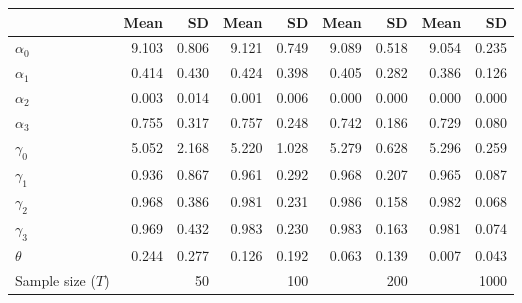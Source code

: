 
\begin{tabular}[t]{lrrrrrrrr}
\toprule
  & Mean & SD & Mean  & SD  & Mean   & SD   & Mean    & SD   \\
\midrule
$\alpha_{0}$ & 9.103 & 0.806 & 9.121 & 0.749 & 9.089 & 0.518 & 9.054 & 0.235\\
$\alpha_{1}$ & 0.414 & 0.430 & 0.424 & 0.398 & 0.405 & 0.282 & 0.386 & 0.126\\
$\alpha_{2}$ & 0.003 & 0.014 & 0.001 & 0.006 & 0.000 & 0.000 & 0.000 & 0.000\\
$\alpha_{3}$ & 0.755 & 0.317 & 0.757 & 0.248 & 0.742 & 0.186 & 0.729 & 0.080\\
$\gamma_{0}$ & 5.052 & 2.168 & 5.220 & 1.028 & 5.279 & 0.628 & 5.296 & 0.259\\
$\gamma_{1}$ & 0.936 & 0.867 & 0.961 & 0.292 & 0.968 & 0.207 & 0.965 & 0.087\\
$\gamma_{2}$ & 0.968 & 0.386 & 0.981 & 0.231 & 0.986 & 0.158 & 0.982 & 0.068\\
$\gamma_{3}$ & 0.969 & 0.432 & 0.983 & 0.230 & 0.983 & 0.163 & 0.981 & 0.074\\
$\theta$ & 0.244 & 0.277 & 0.126 & 0.192 & 0.063 & 0.139 & 0.007 & 0.043\\
Sample size ($T$) &  & 50 &  & 100 &  & 200 &  & 1000\\
\bottomrule
\end{tabular}
